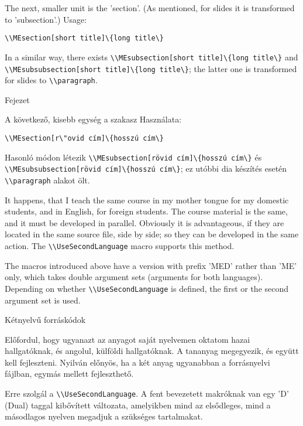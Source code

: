{
The next, smaller unit is the 'section'.
(As mentioned, for slides it is transformed to 'subsection'.)
Usage:\par
\noindent\lstinline|\\MEsection[short title]\{long title\}|

In a similar way, there exists \lstinline|\\MEsubsection[short title]\{long title\}|
and \lstinline|\\MEsubsubsection[short title]\{long title\}|; the latter one is
transformed for slides to \lstinline|\\paragraph|.
}
{Fejezet}
{
A következő, kisebb egység a szakasz
Használata:\par
\noindent\lstinline|\\MEsection[r\"ovid cím]\{hosszú cím\}|

Hasonló módon létezik \lstinline|\\MEsubsection[rövid cím]\{hosszú cím\}|
és \lstinline|\\MEsubsubsection[rövid cím]\{hosszú cím\}|; 
ez utóbbi dia készítés esetén \lstinline|\\paragraph| alakot ölt.

}


{
It happens, that I teach the same course in my mother tongue for my domestic students,
and in English, for foreign students.
The course material is the same, and it must be developed in parallel.
Obviously it is advantageous, if they are located in the same source file, side by side;
so they can be developed in the same action.
The \lstinline|\\UseSecondLanguage| macro supports this method.

The macros introduced above have a version with prefix 'MED' rather than 'ME' only,
which takes double argument sets (arguments for both languages). Depending on whether \lstinline|\\UseSecondLanguage| is defined,
the first or the second argument set is used.
}
{Kétnyelvű forráskódok}
{
Előfordul, hogy ugyanazt az anyagot saját nyelvemen oktatom hazai hallgatóknak,
és angolul, külföldi hallgatóknak. A tananyag megegyezik, és együtt kell fejleszteni.
Nyilván előnyös, ha a két anyag ugyanabban a forrásnyelvi fájlban, egymás mellett fejleszthető.

Erre szolgál a \lstinline|\\UseSecondLanguage|. A fent bevezetett makróknak van egy 'D' (Dual) taggal
kibővített változata, amelyikben mind az elsődleges, mind a másodlagos nyelven 
megadjuk a szükséges tartalmakat.
}


